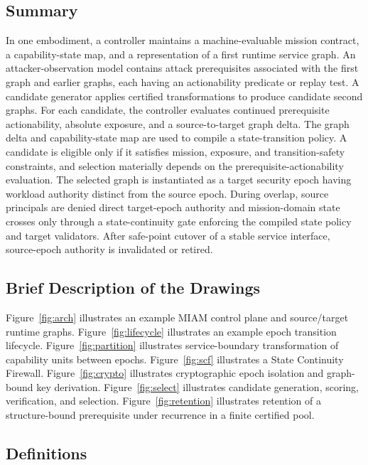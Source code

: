 \documentclass[11pt,letterpaper]{article}
\begin{document}
\subsection{Summary}

In one embodiment, a controller maintains a machine-evaluable mission contract, a capability-state map, and a representation of a first runtime service graph. An attacker-observation model contains attack prerequisites associated with the first graph and earlier graphs, each having an actionability predicate or replay test. A candidate generator applies certified transformations to produce candidate second graphs. For each candidate, the controller evaluates continued prerequisite actionability, absolute exposure, and a source-to-target graph delta. The graph delta and capability-state map are used to compile a state-transition policy. A candidate is eligible only if it satisfies mission, exposure, and transition-safety constraints, and selection materially depends on the prerequisite-actionability evaluation. The selected graph is instantiated as a target security epoch having workload authority distinct from the source epoch. During overlap, source principals are denied direct target-epoch authority and mission-domain state crosses only through a state-continuity gate enforcing the compiled state policy and target validators. After safe-point cutover of a stable service interface, source-epoch authority is invalidated or retired.

\subsection{Brief Description of the Drawings}

Figure~\ref{fig:arch} illustrates an example MIAM control plane and source/target runtime graphs. Figure~\ref{fig:lifecycle} illustrates an example epoch transition lifecycle. Figure~\ref{fig:partition} illustrates service-boundary transformation of capability units between epochs. Figure~\ref{fig:scf} illustrates a State Continuity Firewall. Figure~\ref{fig:crypto} illustrates cryptographic epoch isolation and graph-bound key derivation. Figure~\ref{fig:select} illustrates candidate generation, scoring, verification, and selection. Figure~\ref{fig:retention} illustrates retention of a structure-bound prerequisite under recurrence in a finite certified pool.

\subsection{Definitions}
\end{document}
